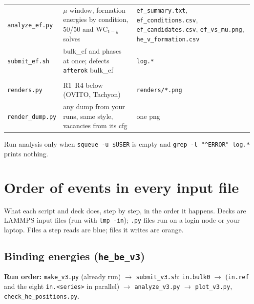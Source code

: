 \documentclass[10pt]{article}
\newcommand{\cmd}[1]{\texttt{\small #1}}
\newcommand{\sect}[1]{\Needspace{12\baselineskip}\section{#1}}
\begin{document}
\begin{xltabular}{\linewidth}{L{2.8cm} Y L{6.2cm}}
\cmd{analyze\_ef.py} & $\mu$ window, formation energies by condition, 50/50 and WC$_{1-y}$ solves & \cmd{ef\_summary.txt}, \cmd{ef\_conditions.csv}, \cmd{ef\_candidates.csv}, \cmd{ef\_vs\_mu.png}, \cmd{he\_v\_formation.csv} \\
\cmd{submit\_ef.sh} & bulk\_ef and phases at once; defects \cmd{afterok} bulk\_ef & \cmd{log.*} \\
 \\
\cmd{renders.py} & R1--R4 below (OVITO, Tachyon) & \cmd{renders/*.png} \\
\cmd{render\_dump.py} & any dump from your runs, same style, vacancies from its cfg & one png \\
\bottomrule
\end{xltabular}
Run analysis only when \cmd{squeue -u \$USER} is empty and \cmd{grep -l "\^{}ERROR" log.*} prints nothing.

\sect{Order of events in every input file}
What each script and deck does, step by step, in the order it happens. Decks are LAMMPS
input files (run with \cmd{lmp -in}); \texttt{.py} files run on a login node or your laptop.
Files a step reads are \textcolor{acc}{blue}; files it writes are \textcolor{org}{orange}.
\newcommand{\rfile}[1]{\textcolor{acc}{\texttt{\small #1}}}
\newcommand{\wfile}[1]{\textcolor{org}{\texttt{\small #1}}}

\subsection{Binding energies (\texttt{he\_be\_v3})}
\textbf{Run order:} \cmd{make\_v3.py} (already run) $\rightarrow$ \cmd{submit\_v3.sh}: \cmd{in.bulk0}
$\rightarrow$ (\cmd{in.ref} and the eight \cmd{in.<series>} in parallel) $\rightarrow$
\cmd{analyze\_v3.py} $\rightarrow$ \cmd{plot\_v3.py}, \cmd{check\_he\_positions.py}.
\end{document}

